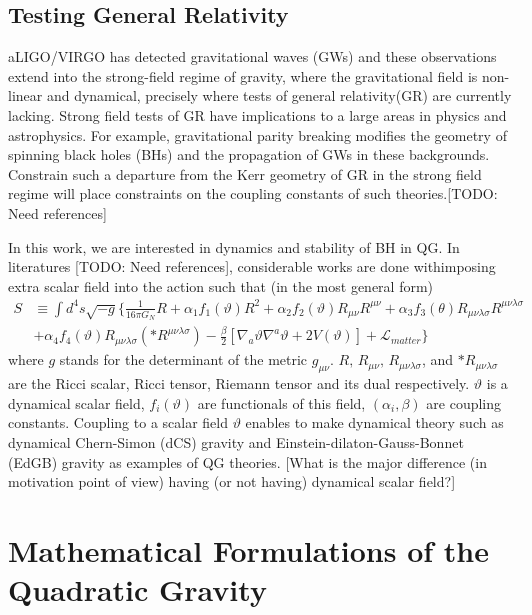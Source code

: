 \documentclass[a4paper,oneside,openany,11pt]{memoir}
\numberwithin{equation}{section} %
\newcommand{\TODO}[1]{{\color{red}[}{\color{red}TODO:} {\color{blue}#1}{\color{red}]}}
\newcommand{\NOTE}[1]{{\color{blue}[#1]}}
\begin{document}
\begin{itemize}
\end{itemize} 

\subsection{Testing General Relativity}
aLIGO/VIRGO has detected gravitational waves (GWs) and these observations extend into the strong-field regime of gravity,
where the gravitational field is non-linear and dynamical, precisely where tests of general relativity(GR) are currently lacking. 
Strong field tests of GR have implications to a large areas in physics and astrophysics. For example, 
gravitational parity breaking modifies the geometry of spinning black holes (BHs) and the propagation of GWs in 
these backgrounds. Constrain such a departure from the Kerr geometry of GR in the strong field regime will place
constraints on the coupling constants of such theories.\TODO{Need references}

In this work, we are interested in dynamics and stability of BH in QG.
In literatures \TODO{Need references}, considerable works are done withimposing extra 
scalar field into the action such that (in the most general form)
\begin{align}
S &\equiv \int d^4 s \sqrt{-g} \Bigg\{ \frac{1}{16 \pi G_N} R + \alpha_1 f_1 (\vartheta) R^2 + \alpha_2 f_2 (\vartheta) R_{\mu \nu} R^{\mu \nu} 
    + \alpha_3 f_3 (\theta) R_{\mu \nu \lambda \sigma} R^{\mu \nu \lambda \sigma} \nonumber \\
    &+ \alpha_4 f_4 (\vartheta) R_{\mu \nu \lambda \sigma} (*R^{\mu \nu \lambda \sigma}) - \frac{\beta}{2} [ \nabla_a \vartheta \nabla^a \vartheta
    + 2 V(\vartheta) ] + \mathcal{L}_{matter} \Bigg\}
\end{align}
where $g$ stands for the determinant of the metric $g_{\mu \nu}$. $R, \, R_{\mu \nu}, \, R_{\mu \nu \lambda \sigma}$, 
and $*R_{\mu \nu \lambda \sigma}$ are the Ricci scalar, Ricci tensor, Riemann tensor and its dual respectively. 
$\vartheta$ is a dynamical scalar field, $f_i (\vartheta)$ are functionals of this field, $(\alpha_i , \beta)$ are coupling constants.
Coupling to a scalar field $\vartheta$ enables to make dynamical theory such as dynamical Chern-Simon (dCS) gravity 
and Einstein-dilaton-Gauss-Bonnet (EdGB) gravity as examples of QG theories.
\NOTE{What is the major difference (in motivation point of view) having (or not having) dynamical scalar field?}


\section{Mathematical Formulations of the Quadratic Gravity}
\end{document}
